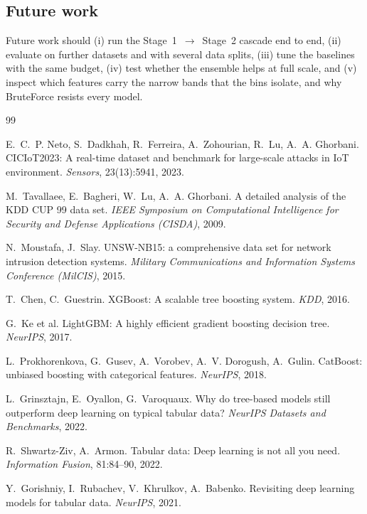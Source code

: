 \documentclass[11pt,a4paper]{article}
\begin{document}
\subsection{Future work}
Future work should (i) run the Stage~1~$\rightarrow$~Stage~2 cascade end to end, (ii) evaluate on further datasets and with several data splits, (iii) tune the baselines with the same budget, (iv) test whether the ensemble helps at full scale, and (v) inspect which features carry the narrow bands that the bins isolate, and why BruteForce resists every model.

\begin{thebibliography}{99}\small

 E.~C.~P. Neto, S.~Dadkhah, R.~Ferreira, A.~Zohourian, R.~Lu, A.~A. Ghorbani. CICIoT2023: A real-time dataset and benchmark for large-scale attacks in IoT environment. \emph{Sensors}, 23(13):5941, 2023.

 M.~Tavallaee, E.~Bagheri, W.~Lu, A.~A. Ghorbani. A detailed analysis of the KDD CUP 99 data set. \emph{IEEE Symposium on Computational Intelligence for Security and Defense Applications (CISDA)}, 2009.

 N.~Moustafa, J.~Slay. UNSW-NB15: a comprehensive data set for network intrusion detection systems. \emph{Military Communications and Information Systems Conference (MilCIS)}, 2015.

 T.~Chen, C.~Guestrin. XGBoost: A scalable tree boosting system. \emph{KDD}, 2016.

 G.~Ke et al. LightGBM: A highly efficient gradient boosting decision tree. \emph{NeurIPS}, 2017.

 L.~Prokhorenkova, G.~Gusev, A.~Vorobev, A.~V. Dorogush, A.~Gulin. CatBoost: unbiased boosting with categorical features. \emph{NeurIPS}, 2018.

 L.~Grinsztajn, E.~Oyallon, G.~Varoquaux. Why do tree-based models still outperform deep learning on typical tabular data? \emph{NeurIPS Datasets and Benchmarks}, 2022.

 R.~Shwartz-Ziv, A.~Armon. Tabular data: Deep learning is not all you need. \emph{Information Fusion}, 81:84--90, 2022.

 Y.~Gorishniy, I.~Rubachev, V.~Khrulkov, A.~Babenko. Revisiting deep learning models for tabular data. \emph{NeurIPS}, 2021.


\end{thebibliography}
\end{document}
